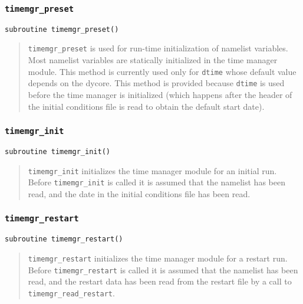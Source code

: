 \documentclass[12pt]{article}
\newcommand{\code}[1]{\texttt{#1}}
\begin{document}
\setlength{\parindent}{0in}

\subsubsection{\code{timemgr\_preset}}
\begin{verbatim}
subroutine timemgr_preset()
\end{verbatim}

\begin{quote}
\code{timemgr\_preset} is used for run-time initialization of namelist
variables.  Most namelist variables are statically initialized in the time
manager module.  This method is currently used only for \code{dtime} whose
default value depends on the dycore.  This method is provided because
\code{dtime} is used before the time manager is initialized (which happens
after the header of the initial conditions file is read to obtain the
default start date).
\end{quote}


\subsubsection{\code{timemgr\_init}}
\begin{verbatim}
subroutine timemgr_init()
\end{verbatim}

\begin{quote}
\code{timemgr\_init} initializes the time manager module for an initial run.
Before \code{timemgr\_init} is called it is assumed that the namelist has
been read, and the date in the initial conditions file has been read.
\end{quote}


\subsubsection{\code{timemgr\_restart}}
\begin{verbatim}
subroutine timemgr_restart()
\end{verbatim}

\begin{quote}
\code{timemgr\_restart} initializes the time manager module for a restart
run.  Before \code{timemgr\_restart} is called it is assumed that the
namelist has been read, and the restart data has been read from the restart
file by a call to \code{timemgr\_read\_restart}.
\end{quote}
\end{document}
